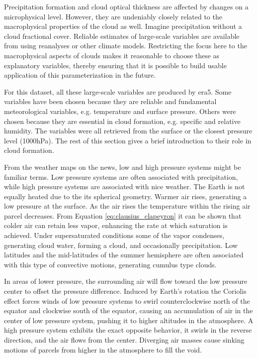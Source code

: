 Precipitation formation and cloud optical thickness are affected by changes on a microphysical level. However, they are undeniably closely related to the macrophysical properties of the cloud as well. Imagine precipitation without a cloud fractional cover. 
Reliable estimates of large-scale variables are available from using reanalyses or other climate models. Restricting the focus here to the macrophysical aspects of clouds makes it reasonable to choose these as explanatory variables, thereby ensuring that it is possible to build usable application of this parameterization in the future.

For this dataset, all these large-scale variables are produced by \acrshort{era5}. Some variables have been chosen because they are reliable and fundamental meteorological variables, e.g. temperature and surface pressure. Others were chosen because they are essential in cloud formation, e.g. specific and relative humidity. The variables were all retrieved from the surface or the closest pressure level (1000hPa). The rest of this section gives a brief introduction to their role in cloud formation.

From the weather maps on the news, low and high pressure systems might be familiar terms. Low pressure systems are often associated with precipitation, while high pressure systems are associated with nice weather. The Earth is not equally heated due to the its spherical geometry. Warmer air rises, generating a low pressure at the surface. As the air rises the temperature within the rising air parcel decreases. From Equation \eqref{eq:clausius_clapeyron} it can be shown that colder air can retain less vapor, enhancing the rate at which saturation is achieved. Under supersaturated conditions some of the vapor condenses, generating cloud water, forming a cloud, and occasionally precipitation. Low latitudes and the mid-latitudes of the summer hemisphere are often associated with this type of convective motions, generating cumulus type clouds. 

In areas of lower pressure, the surrounding air will flow toward the low pressure center to offset the pressure difference. Induced by Earth's rotation the Coriolis effect forces winds of low pressure systems to swirl counterclockwise north of the equator and clockwise south of the equator, causing an accumulation of air in the center of low pressure system, pushing it to higher altitudes in the atmosphere. A high pressure system exhibits the exact opposite behavior, it swirls in the reverse direction, and the air flows from the center. Diverging air masses cause sinking motions of parcels from higher in the atmosphere to fill the void. 

